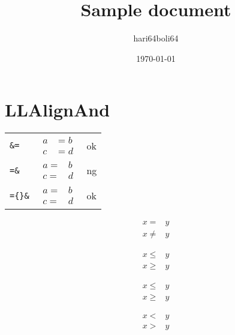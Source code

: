 \documentclass[a4paper]{article}
\newcommand{\tA}[1]{\textcolor{cA}{#1}}
\newcommand{\tD}[1]{\textcolor{cD}{#1}}
\begin{document}
\title{Sample document}
\author{hari64boli64}
\date{\today}
\maketitle

\section{LLAlignAnd}

\begin{table}[H]
	\centering
	\begin{tabular}{lll}
		\verb|&=|        &
		$\begin{aligned}
				 a & = b \\
				 c & = d
			 \end{aligned}$ &
		\tA{ok}            \\[0.3cm]
		\verb|=&|        &
		$\begin{aligned}
				 a = & b \\
				 c = & d
			 \end{aligned}$ &
		\tD{ng}            \\[0.3cm]
		\verb|={}&|      &
		$\begin{aligned}
				 a = {} & b \\
				 c = {} & d
			 \end{aligned}$ &
		\tA{ok}
	\end{tabular}
\end{table}

\begin{center}
	\begin{minipage}{.1\columnwidth}
		\begin{align*}
			x
			=
			 &
			y
			\\
			x
			\neq
			 &
			y
		\end{align*}
	\end{minipage}%
	\begin{minipage}{.1\columnwidth}
		\begin{align*}
			x \leq & y \\
			x \geq & y
		\end{align*}
	\end{minipage}%
	\begin{minipage}{.1\columnwidth}
		\begin{align*}
			x \le & y \\
			x \ge & y
		\end{align*}
	\end{minipage}%
	\begin{minipage}{.1\columnwidth}
		\begin{align*}
			x < & y \\
			x > & y
		\end{align*}
	\end{minipage}
\end{center}
\end{document}
